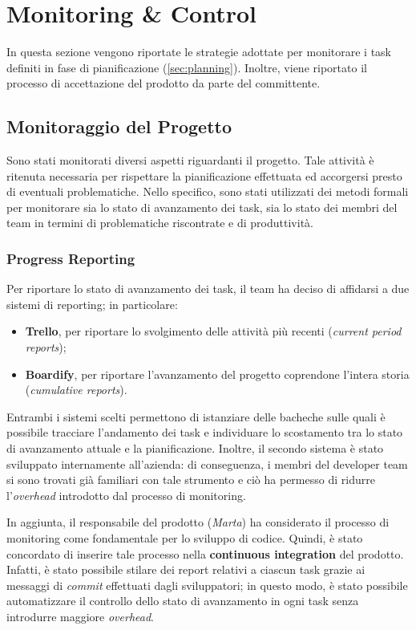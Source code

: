 \section{Monitoring \& Control}
\label{sec:monitoring}

In questa sezione vengono riportate le strategie adottate per monitorare i task definiti in fase di pianificazione (\ref{sec:planning}). Inoltre, viene riportato il processo di accettazione del prodotto da parte del committente.

\subsection{Monitoraggio del Progetto}
Sono stati monitorati diversi aspetti riguardanti il progetto. Tale attività è ritenuta necessaria per rispettare la pianificazione effettuata ed accorgersi presto di eventuali problematiche. Nello specifico, sono stati utilizzati dei metodi formali per monitorare sia lo stato di avanzamento dei task, sia lo stato dei membri del team in termini di problematiche riscontrate e di produttività.

\subsubsection{Progress Reporting}
Per riportare lo stato di avanzamento dei task, il team ha deciso di affidarsi a due sistemi di reporting; in particolare:
\begin{itemize}
    \item \textbf{Trello}, per riportare lo svolgimento delle attività più recenti (\textit{current period reports});
    \item \textbf{Boardify}, per riportare l'avanzamento del progetto coprendone l'intera storia (\textit{cumulative reports}).
\end{itemize}
Entrambi i sistemi scelti permettono di istanziare delle bacheche sulle quali è possibile tracciare l'andamento dei task e individuare lo scostamento tra lo stato di avanzamento attuale e la pianificazione. Inoltre, il secondo sistema è stato sviluppato internamente all'azienda: di conseguenza, i membri del developer team si sono trovati già familiari con tale strumento e ciò ha permesso di ridurre l'\textit{overhead} introdotto dal processo di monitoring.

In aggiunta, il responsabile del prodotto (\textit{Marta}) ha considerato il processo di monitoring come fondamentale per lo sviluppo di codice. Quindi, è stato concordato di inserire tale processo nella \textbf{continuous integration} del prodotto. Infatti, è stato possibile stilare dei report relativi a ciascun task grazie ai messaggi di \textit{commit} effettuati dagli sviluppatori; in questo modo, è stato possibile automatizzare il controllo dello stato di avanzamento in ogni task senza introdurre maggiore \textit{overhead}.

